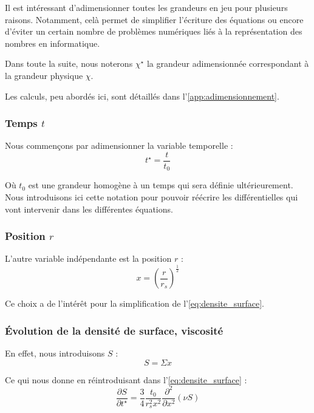 Il est intéressant d’adimensionner toutes les grandeurs en jeu pour plusieurs
raisons. Notamment, celà permet de simplifier l’écriture des équations ou
encore d’éviter un certain nombre de problèmes numériques liés à la
représentation des nombres en informatique.

Dans toute la suite, nous noterons $\chi^\star$ la grandeur adimensionnée
correspondant à la grandeur physique $\chi$.

Les calculs, peu abordés ici, sont détaillés dans
l’\cref{app:adimensionnement}.

\subsubsection{\texorpdfstring{Temps $t$}{Temps t}}

Nous commençons par adimensionner la variable temporelle :
\begin{equation}
    t^\star = \frac{t}{t_0}
\end{equation}

Où $t_0$ est une grandeur homogène à un temps qui sera définie ultérieurement.
Nous introduisons ici cette notation pour pouvoir réécrire les différentielles
qui vont intervenir dans les différentes équations.

\subsubsection{\texorpdfstring{Position $r$}{Position r}}

L’autre variable indépendante est la position $r$ :
\begin{equation}
    \label{eq:position_adim}
    x = \left( \frac{r}{r_s} \right)^\frac{1}{2}
\end{equation}

Ce choix a de l’intérêt pour la simplification de l’\cref{eq:densite_surface}.

\subsubsection{Évolution de la densité de surface, viscosité}

En effet, nous introduisons $S$ :
\begin{equation}
    \label{eq:definition_S}
    S = \Sigma x
\end{equation}

Ce qui nous donne en réintroduisant dans l’\cref{eq:densite_surface} :
\begin{equation}
    \label{eq:rel_densite_surface}
    \frac{\partial S}{\partial t^\star} = \frac{3}{4} \frac{t_0}{r_s^2 x^2} \frac{\partial^2}{\partial x^2} \left(\nu S\right)
\end{equation}


